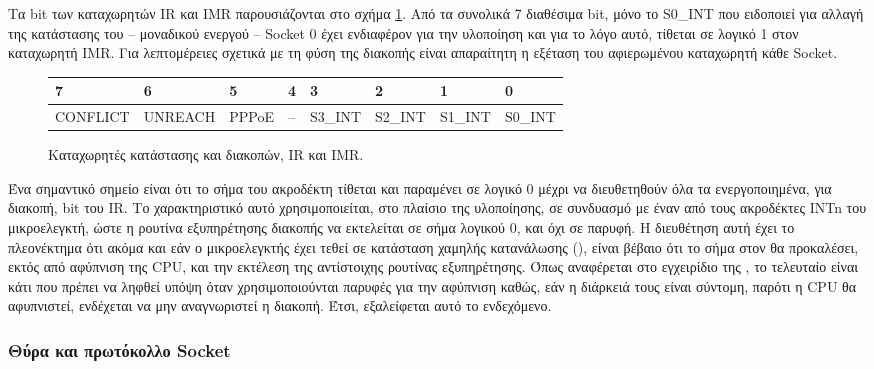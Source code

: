 Τα bit των καταχωρητών IR και IMR παρουσιάζονται στο σχήμα
\ref{fig:network:ir_imr}. Από τα συνολικά 7 διαθέσιμα bit, μόνο το S0\_INT που
ειδοποιεί για αλλαγή της κατάστασης του  -- μοναδικού ενεργού -- Socket 0 έχει
ενδιαφέρον για την υλοποίηση και για το λόγο αυτό, τίθεται σε λογικό 1 στον
καταχωρητή IMR. Για λεπτομέρειες σχετικά με τη φύση της διακοπής είναι
απαραίτητη η εξέταση του αφιερωμένου καταχωρητή κάθε Socket.

\begin{figure}
    \caption{Καταχωρητές κατάστασης και διακοπών, IR και IMR.
    \label{fig:network:ir_imr}}
    \begin{center}\begin{tabu} spread 0pt {|*8{X[-1,C]|}}

    \hline
    \rowfont\bfseries
           7 &       6 &     5 &  4 &       3 &       2 &       1 &       0   \\
    \hline
    CONFLICT & UNREACH & PPPoE & -- & S3\_INT & S2\_INT & S1\_INT & S0\_INT   \\
    \hline
    \end{tabu}\end{center}
\end{figure}

Ένα σημαντικό σημείο είναι ότι το σήμα του ακροδέκτη  τίθεται και
παραμένει σε λογικό 0 μέχρι να διευθετηθούν όλα τα ενεργοποιημένα, για διακοπή,
bit του IR. Το χαρακτηριστικό αυτό χρησιμοποιείται, στο πλαίσιο της υλοποίησης,
σε συνδυασμό με έναν από τους ακροδέκτες INTn του μικροελεγκτή, ώστε η ρουτίνα
εξυπηρέτησης διακοπής να εκτελείται σε σήμα λογικού 0, και όχι σε παρυφή. Η
διευθέτηση αυτή έχει το πλεονέκτημα ότι ακόμα και εάν ο μικροελεγκτής έχει τεθεί
σε κατάσταση χαμηλής κατανάλωσης (), είναι βέβαιο ότι το σήμα
στον  θα προκαλέσει, εκτός από αφύπνιση της CPU, και την εκτέλεση της
αντίστοιχης ρουτίνας εξυπηρέτησης. Όπως αναφέρεται στο εγχειρίδιο της
\textcite[71]{atmel13}, το τελευταίο είναι κάτι που πρέπει να ληφθεί υπόψη όταν
χρησιμοποιούνται παρυφές για την αφύπνιση καθώς, εάν η διάρκειά τους είναι
σύντομη, παρότι η CPU θα αφυπνιστεί, ενδέχεται να μην αναγνωριστεί η διακοπή.
Έτσι, εξαλείφεται αυτό το ενδεχόμενο.


\subsubsection{Θύρα και πρωτόκολλο Socket}
\label{ssubsec:network:port_mr}


